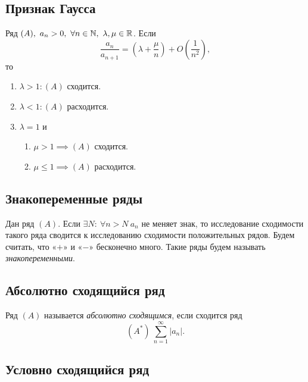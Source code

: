 \subsection{Признак Гаусса}

\begin{theorem}
    Ряд $(A), \ a_n > 0, \ \forall n \in \mathbb{N}, \ \lambda, \mu \in \mathbb{R}$. Если
    \[
        \frac{a_n}{a_{n+1}} = \left(\lambda + \frac{\mu}{n}\right) + O\left(\frac{1}{n^2}\right),
    \]
    то
    \begin{enumerate}
        \item $\lambda > 1: (A)$ сходится.
        \item $\lambda < 1: (A)$ расходится.
        \item $\lambda = 1$ и \begin{enumerate}
                  \item $\mu > 1 \implies (A)$ сходится.
                  \item $\mu \leqslant 1 \implies (A)$ расходится.
              \end{enumerate}
    \end{enumerate}
\end{theorem}

\subsection{Знакопеременные ряды}

\begin{note}
    Дан ряд $(A)$. Если $\exists N: \ \forall n > N \ a_n$ не меняет знак, то исследование сходимости такого ряда сводится к исследованию сходимости положительных рядов. Будем считать, что «$+$» и «$-$» бесконечно много. Такие ряды будем называть \emph{знакопеременными}.
\end{note}

\subsection{Абсолютно сходящийся ряд}

\begin{definition}
    Ряд $(A)$ называется \emph{абсолютно сходящимся}, если сходится ряд
    \[
        (A^*) \ \sum_{n=1}^{\infty}|a_n|.
    \]
\end{definition}

\subsection{Условно сходящийся ряд}

